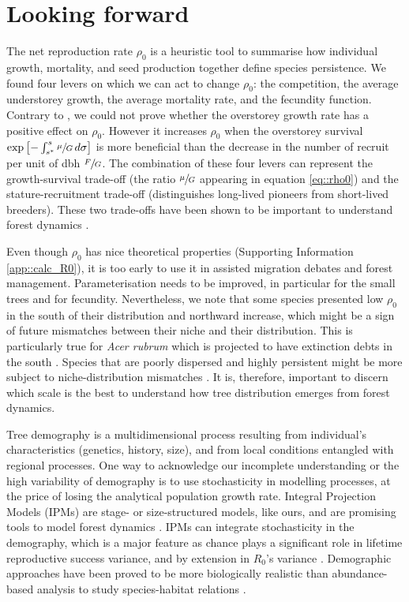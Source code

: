 \section{Looking forward}
The net reproduction rate $ \rho_0 $ is a heuristic tool to summarise how individual growth, mortality, and seed production together define species persistence. We found four levers on which we can act to change $ \rho_0 $: the competition, the average understorey growth, the average mortality rate, and the fecundity function. Contrary to \citet{Purves2009}, we could not prove whether the overstorey growth rate has a positive effect on $ \rho_0 $. However it increases $ \rho_0 $ when the overstorey survival $ \exp \left[ -\int_{{s}^{*}}^{s} \sfrac{\mu}{G} \, d \sigma \right] $ is more beneficial than the decrease in the number of recruit per unit of dbh $ \sfrac{F}{G} $. The combination of these four levers can represent the growth-survival trade-off (\eg the ratio $ \sfrac{\mu}{G} $ appearing in equation \eqref{eq::rho0}) and the stature-recruitment trade-off (distinguishes long-lived pioneers from short-lived breeders). These two trade-offs have been shown to be important to understand forest dynamics \citep[for tropical forest]{Ruger2020}. 

Even though $ \rho_0 $ has nice theoretical properties (Supporting Information \ref{app::calc_R0}), it is too early to use it in assisted migration debates and forest management. Parameterisation needs to be improved, in particular for the small trees and for fecundity. Nevertheless, we note that some species presented low $ \rho_0 $ in the south of their distribution and northward increase, which might be a sign of future mismatches between their niche and their distribution. This is particularly true for \textit{Acer rubrum} which is projected to have extinction debts in the south \citep{Talluto2017a}. Species that are poorly dispersed and highly persistent might be more subject to niche-distribution mismatches \citep[study on shrubs of the Proteaceae family in South Africa, not on trees]{Pagel2020}. It is, therefore, important to discern which scale is the best to understand how tree distribution emerges from forest dynamics.

Tree demography is a multidimensional process resulting from individual's characteristics (\eg genetics, history, size), and from local conditions entangled with regional processes. One way to acknowledge our incomplete understanding or the high variability of demography is to use stochasticity in modelling processes, at the price of losing the analytical population growth rate. Integral Projection Models (IPMs) are stage- or size-structured models, like ours, and are promising tools to model forest dynamics \citep{Vindenes2012, Kunstler2019, Merow2014}. IPMs can integrate stochasticity in the demography, which is a major feature as chance plays a significant role in lifetime reproductive success variance, and by extension in $ R_0 $'s variance \citep{Snyder2016, Snyder2018}. Demographic approaches have been proved to be more biologically realistic than abundance-based analysis to study species-habitat relations \citep{Bin2016}. 

